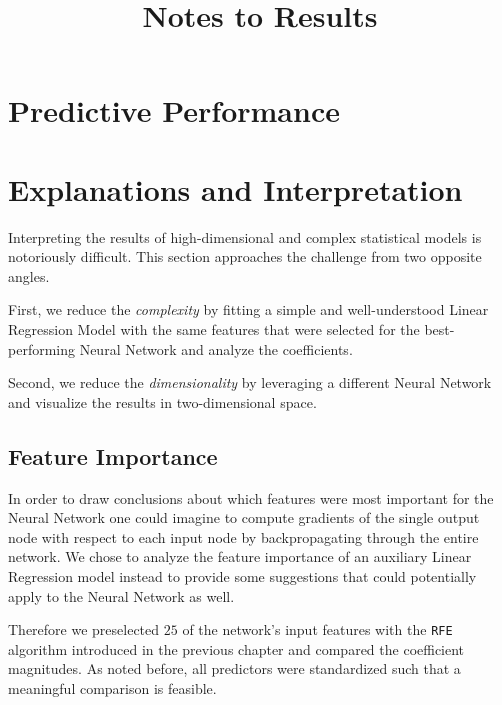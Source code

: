 \documentclass[12pt, letterpaper]{article}
\title{Notes to Results}
\author{}
\date{}
\begin{document}
\maketitle

\section{Predictive Performance}



\section{Explanations and Interpretation}

Interpreting the results of high-dimensional and complex statistical models is notoriously difficult.
This section approaches the challenge from two opposite angles.

First, we reduce the \emph{complexity} by fitting a simple and well-understood Linear Regression Model with the same features that were selected for the best-performing Neural Network and analyze the coefficients.

Second, we reduce the \emph{dimensionality} by leveraging a different Neural Network and visualize the results in two-dimensional space.

\subsection{Feature Importance}

In order to draw conclusions about which features were most important for the Neural Network one could imagine to compute gradients of the single output node with respect to each input node by backpropagating through the entire network.
We chose to analyze the feature importance of an auxiliary Linear Regression model instead to provide some suggestions that could potentially apply to the Neural Network as well.

Therefore we preselected $25$ of the network's input features with the \texttt{RFE} algorithm introduced in the previous chapter and compared the coefficient magnitudes.
As noted before, all predictors were standardized such that a meaningful comparison is feasible.
\end{document}

